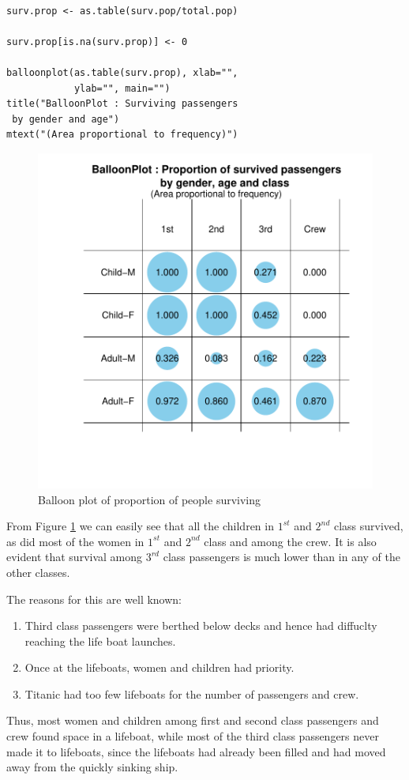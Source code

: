 \documentclass[a4paper]{report}
\begin{document}
\begin{article}
{\small
\begin{verbatim}

surv.prop <- as.table(surv.pop/total.pop)

surv.prop[is.na(surv.prop)] <- 0

balloonplot(as.table(surv.prop), xlab="",
            ylab="", main="")
title("BalloonPlot : Surviving passengers
 by gender and age")
mtext("(Area proportional to frequency)")
\end{verbatim}
}


\begin{figure}[h]
\includegraphics[width=\textwidth]{SurvivedProp.pdf}
\vspace{-0.65in}
\caption{\label{figure:Surv.Prop}
Balloon plot of proportion of people surviving}
\end{figure}

From Figure \ref{figure:Surv.Prop} we can easily see that all the
children in $1^{st}$ and $2^{nd}$ class survived, as did most of the
women in $1^{st}$ and $2^{nd}$ class and among the crew.  It is also
evident that survival among $3^{rd}$ class passengers is much lower
than in any of the other classes.

The reasons for this are well known: 
\begin{enumerate}
  \item Third class passengers were berthed below decks and hence
  had diffuclty reaching the life boat launches.
  \item Once at the lifeboats, women and children had priority.
  \item Titanic had too few lifeboats for the number of passengers and crew.
\end{enumerate}
Thus, most women and children among first and second class
passengers and crew found space in a lifeboat, while most of the
third class passengers never made it to lifeboats, since the
lifeboats had already been filled and had moved away from the
quickly sinking ship.


\end{article}
\end{document}
